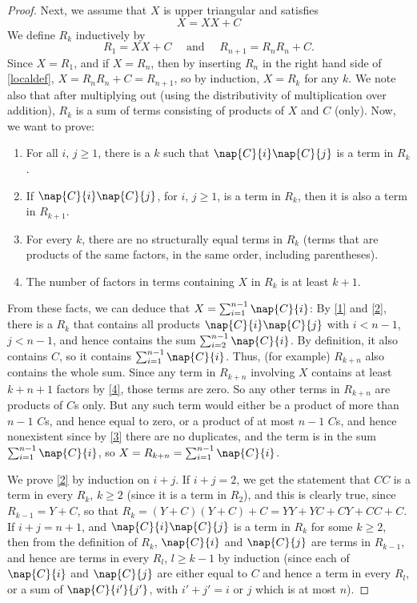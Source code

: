 \begin{proof}
   Next, we assume that $X$ is upper triangular and satisfies 
   \begin{equation*}
     \label{localdef}
     X = XX + C 
   \end{equation*}
   We define $R_k$ inductively by
   \begin{equation*}
     R_1 = XX + C \quad \text{ and } \quad R_{n + 1} = R_nR_n + C.
   \end{equation*}
   Since $X = R_1$, and if $X = R_n$, then by inserting $R_n$ in the right hand side of \eqref{localdef}, $X = R_nR_n + C = R_{n + 1}$, so by induction, $X = R_k$ for any $k$. We note also that after multiplying out (using the distributivity of multiplication over addition), $R_k$ is a sum of terms consisting of products of $X$ and $C$ (only). Now, we want to prove:
   \begin{enumerate}
   \item \label{1} For all $i$, $j \ge 1$, there is a $k$  such that $\nap{C}{i}\nap{C}{j}$ is a term in $R_k$.
   \item \label{2} If $\nap{C}{i}\nap{C}{j}$, for $i$, $j \ge 1$, is a term in $R_k$, then it is also a term in $R_{k + 1}$.
   \item \label{3} For every $k$, there are no structurally equal terms in $R_k$ (terms that are products of the same factors, in the same order, including parentheses).
   \item \label{4} The number of factors in terms containing $X$ in $R_k$ is at least $k + 1$. 
   \end{enumerate}
   From these facts, we can deduce that $X = \sum_{i = 1}^{n-1}\nap{C}{i}$: By \ref{1} and \ref{2}, there is a $R_k$ that contains all products $\nap{C}{i}\nap{C}{j}$ with $i < n - 1$, $j < n - 1$, and hence contains the sum $\sum_{i = 2}^{n-1}\nap{C}{i}$. By definition, it also contains $C$, so it contains $\sum_{i = 1}^{n-1}\nap{C}{i}$. Thus, (for example) $R_{k + n}$ also contains the whole sum. Since any term in $R_{k + n}$ involving $X$ contains at least $k + n + 1$ factors by \ref{4}, those terms are zero. So any other terms in $R_{k + n}$ are products of $C$s only. But any such term would either be a product of more than $n-1$  $C$s, and hence equal to zero, or a product of at most $n-1$ $C$s, and hence nonexistent since by \ref{3} there are no duplicates, and the term is in the sum $\sum_{i = 1}^{n-1}\nap{C}{i}$, so $X = R_{k + n} = \sum_{i = 1}^{n-1}\nap{C}{i}$.

We prove \ref{2} by induction on $i + j$. If $i+j = 2$, we get the statement that $CC$ is a term in every $R_k$, $k \ge 2$ (since it is a term in $R_2$), and this is clearly true, since $R_{k - 1} = Y + C$, so that $R_{k} = (Y + C)(Y + C) + C = YY + YC + CY + CC + C$. If $i + j = n + 1$, and $\nap{C}{i}\nap{C}{j}$ is a term in $R_{k}$ for some $k \ge 2$, then from the definition of $R_k$, $\nap{C}{i}$ and $\nap{C}{j}$ are terms in $R_{k-1}$, and hence are terms in every $R_l$, $l \ge k-1$ by induction (since each of $\nap{C}{i}$ and $\nap{C}{j}$ are either equal to $C$ and hence a term in every $R_l$, or a sum of $\nap{C}{i'}{j'}$, with $i' + j' = i$ or $j$ which is at most $n$).


\end{proof}
